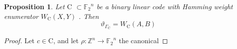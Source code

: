 \documentclass{article}
\newtheorem{prop}[theorem]{Proposition}
\numberwithin{equation}{theorem}
\numberwithin{figure}{theorem}
\newcommand{\Ftwo}{\ensuremath{\mathbb{F}_2}}
\newcommand{\simpleCodes}{\ensuremath{\mathrm{C}}}
\newcommand{\buildLattice}[1]{\ensuremath{\Gamma_{#1}}}
\newcommand{\weightEnumerator}[3]{\ensuremath{W_{#1}(#2,#3)}}
\newcommand{\thetaFunction}[1]{\ensuremath{\vartheta_{#1}}}
\newcommand{\Integer}{\ensuremath{\mathbb{Z}}}
\begin{document}
\begin{prop}\label{ABHammingProp}
Let {\simpleCodes} $\subset \Ftwo^n$ be a binary linear code with Hamming weight enumerator {\weightEnumerator{\simpleCodes}{X}{Y}} . Then
\[
	\thetaFunction{\buildLattice{\simpleCodes}} = \weightEnumerator{\simpleCodes}{A}{B}
\]
\end{prop}
\begin{proof}
Let $c \in \simpleCodes$, and let $\rho : \Integer^n \rightarrow \Ftwo^n$ the canonical
\end{proof}
\end{document}
